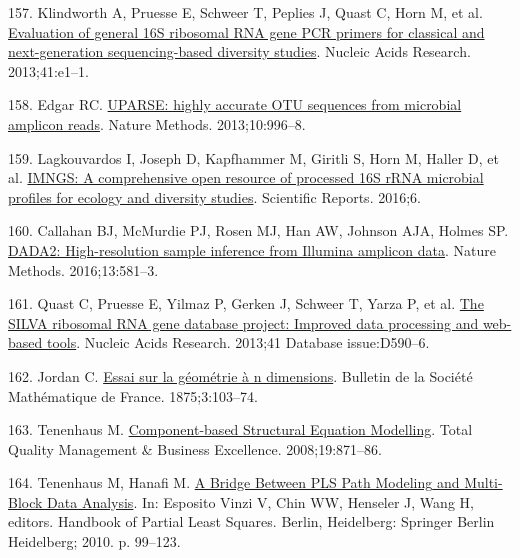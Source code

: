 \documentclass[
  12pt,
  a4paper,
  twoside,
  openright]{book}
\newlength{\cslhangindent}
\newlength{\cslentryspacingunit} %
\newenvironment{CSLReferences}[2] %
 {%
  \setlength{\parindent}{0pt}
  \ifodd #1
  \let\oldpar\par
  \def\par{\hangindent=\cslhangindent\oldpar}
  \fi
  \setlength{\parskip}{#2\cslentryspacingunit}
 }%
 {}
\begin{document}
\begin{CSLReferences}{0}{0}
\leavevmode{}%
157. Klindworth A, Pruesse E, Schweer T, Peplies J, Quast C, Horn M, et al. \href{https://doi.org/10.1093/nar/gks808}{Evaluation of general 16S ribosomal RNA gene PCR primers for classical and next-generation sequencing-based diversity studies}. Nucleic Acids Research. 2013;41:e1--1.

\leavevmode{}%
158. Edgar RC. \href{https://doi.org/10.1038/nmeth.2604}{UPARSE: highly accurate OTU sequences from microbial amplicon reads}. Nature Methods. 2013;10:996--8.

\leavevmode{}%
159. Lagkouvardos I, Joseph D, Kapfhammer M, Giritli S, Horn M, Haller D, et al. \href{https://doi.org/10.1038/srep33721}{IMNGS: A comprehensive open resource of processed 16S rRNA microbial profiles for ecology and diversity studies}. Scientific Reports. 2016;6.

\leavevmode{}%
160. Callahan BJ, McMurdie PJ, Rosen MJ, Han AW, Johnson AJA, Holmes SP. \href{https://doi.org/10.1038/nmeth.3869}{DADA2: High-resolution sample inference from Illumina amplicon data}. Nature Methods. 2016;13:581--3.

\leavevmode{}%
161. Quast C, Pruesse E, Yilmaz P, Gerken J, Schweer T, Yarza P, et al. \href{https://doi.org/10.1093/nar/gks1219}{The SILVA ribosomal RNA gene database project: Improved data processing and web-based tools}. Nucleic Acids Research. 2013;41 Database issue:D590--6.

\leavevmode{}%
162. Jordan C. \href{https://doi.org/10.24033/bsmf.90}{Essai sur la géométrie à n dimensions}. Bulletin de la Société Mathématique de France. 1875;3:103--74.

\leavevmode{}%
163. Tenenhaus M. \href{https://doi.org/10.1080/14783360802159543}{Component-based {Structural Equation Modelling}}. Total Quality Management \& Business Excellence. 2008;19:871--86.

\leavevmode{}%
164. Tenenhaus M, Hanafi M. \href{https://doi.org/10.1007/978-3-540-32827-8_5}{A {Bridge Between PLS Path Modeling} and {Multi}-{Block Data Analysis}}. In: Esposito Vinzi V, Chin WW, Henseler J, Wang H, editors. Handbook of {Partial Least Squares}. Berlin, Heidelberg: {Springer Berlin Heidelberg}; 2010. p. 99--123.


\end{CSLReferences}
\end{document}
